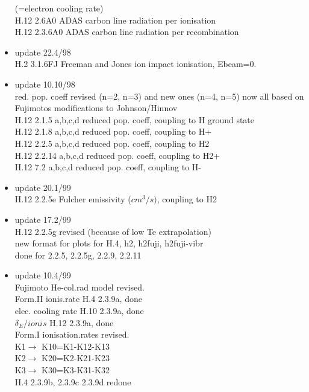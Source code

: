 \documentclass[12pt]{article}
\begin{document}
\begin{itemize}
                   (=electron cooling rate)\\
  H.12 2.6A0 ADAS  carbon line radiation per ionisation\\
  H.12 2.3.6A0 ADAS  carbon line radiation per recombination
 \item update   22.4/98 \\
  H.2  3.1.6FJ  Freeman and Jones ion impact ionisation, Ebeam=0.
 \item update   10.10/98 \\
  red. pop. coeff revised (n=2, n=3) and new ones (n=4, n=5)
  now all based on Fujimotos modifications to Johnson/Hinnov\\
  H.12 2.1.5  a,b,c,d  reduced pop. coeff, coupling to H ground state\\
  H.12 2.1.8  a,b,c,d  reduced pop. coeff, coupling to H+\\
  H.12 2.2.5  a,b,c,d  reduced pop. coeff, coupling to H2\\
  H.12 2.2.14 a,b,c,d  reduced pop. coeff, coupling to H2+\\
  H.12 7.2    a,b,c,d  reduced pop. coeff, coupling to H-\\
 \item update   20.1/99 \\
  H.12 2.2.5e Fulcher emissivity ($cm^3/s)$, coupling to H2\\
 \item update   17.2/99 \\
  H.12 2.2.5g revised (because of low Te extrapolation)\\
  new format for plots for H.4,  h2, h2fuji, h2fuji-vibr \\
  done for 2.2.5, 2.2.5g, 2.2.9, 2.2.11
 \item update   10.4/99 \\
  Fujimoto He-col.rad model revised.\\
  Form.II      ionis.rate          H.4  2.3.9a, done \\
               elec. cooling rate  H.10 2.3.9a, done \\
              $\delta_E/ionis$     H.12 2.3.9a, done \\
  Form.I ionisation.rates revised. \\
   K1$\rightarrow$ K10=K1-K12-K13 \\
   K2$\rightarrow$ K20=K2-K21-K23 \\
   K3$\rightarrow$ K30=K3-K31-K32 \\
               H.4 2.3.9b, 2.3.9c 2.3.9d  redone \\

\end{itemize}
\end{document}
